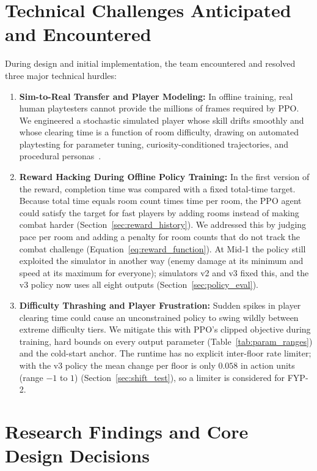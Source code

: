 \section{Technical Challenges Anticipated and Encountered}
During design and initial implementation, the team encountered and resolved three major technical hurdles:
\begin{enumerate}
    \item \textbf{Sim-to-Real Transfer and Player Modeling:} In offline training, real human playtesters cannot provide the millions of frames required by PPO. We engineered a stochastic simulated player whose skill drifts smoothly and whose clearing time is a function of room difficulty, drawing on automated playtesting for parameter tuning, curiosity-conditioned trajectories, and procedural personas~\cite{holmgard2019procedural, zook2014playtesting, sestini2024automated}.
    \item \textbf{Reward Hacking During Offline Policy Training:} In the first version of the reward, completion time was compared with a fixed total-time target. Because total time equals room count times time per room, the PPO agent could satisfy the target for fast players by adding rooms instead of making combat harder (Section~\ref{sec:reward_history}). We addressed this by judging pace per room and adding a penalty for room counts that do not track the combat challenge (Equation~\ref{eq:reward_function}). At Mid-1 the policy still exploited the simulator in another way (enemy damage at its minimum and speed at its maximum for everyone); simulators v2 and v3 fixed this, and the v3 policy now uses all eight outputs (Section~\ref{sec:policy_eval}).
    \item \textbf{Difficulty Thrashing and Player Frustration:} Sudden spikes in player clearing time could cause an unconstrained policy to swing wildly between extreme difficulty tiers. We mitigate this with PPO's clipped objective during training, hard bounds on every output parameter (Table~\ref{tab:param_ranges}) and the cold-start anchor. The runtime has no explicit inter-floor rate limiter; with the v3 policy the mean change per floor is only $0.058$ in action units (range $-1$ to $1$) (Section~\ref{sec:shift_test}), so a limiter is considered for FYP-2.
\end{enumerate}

\section{Research Findings and Core Design Decisions}

